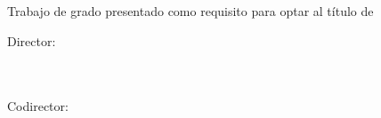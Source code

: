 
\begin{titlepage}
\thispagestyle{empty}
\begin{center}
\singlespacing

\vspace*{2cm}
{\bfseries \tituloTrabajo\par}

\vfill
\autores\par

\vfill
\universidad\\
\facultad\\
\programa\\
\ciudad\\
\anio
\end{center}
\end{titlepage}

\begin{titlepage}
\thispagestyle{empty}
\begin{center}
\singlespacing
\vspace*{2cm}
{\bfseries \tituloTrabajo\par}

\vfill
\autores\par

\vfill
Trabajo de grado presentado como requisito para optar al título de\\
\tituloProfesional

\vfill
Director:\\
\director\\
\directorFormacion\\
\directorAfiliacion

\vspace{0.8cm}
Codirector:\\
\codirector\\
\codirectorFormacion\\
\codirectorAfiliacion

\vfill
\universidad\\
\facultad\\
\programa\\
\ciudad\\
\anio
\end{center}
\end{titlepage}
